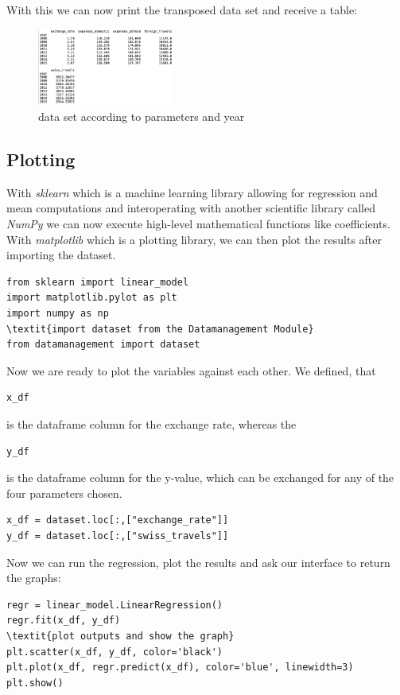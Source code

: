 \documentclass[12pt,a4paper,bibliography=totocnumbered,listof=totocnumbered]{scrartcl}
\begin{document}
With this we can now print the transposed data set and receive a table:

\begin{figure}[htbp] 
  \centering
     \includegraphics[width=0.4\textwidth]{data_table}
  \caption{data set according to parameters and year }
  \label{fig: figure2}
\end{figure}


\subsection{Plotting}
With \textit{sklearn} which is a machine learning library allowing for regression and mean computations and interoperating with another scientific library called \textit{NumPy} we can now execute high-level mathematical functions like coefficients. With \textit{matplotlib} which is a plotting library, we can then plot the results after importing the dataset. 

\begin{verbatim}
from sklearn import linear_model
import matplotlib.pylot as plt
import numpy as np
\textit{import dataset from the Datamanagement Module}
from datamanagement import dataset
\end{verbatim}

Now we are ready to plot the variables against each other. We defined, that \begin{verbatim}
x_df
\end{verbatim} is the dataframe column for the exchange rate, whereas the \begin{verbatim}
y_df
\end{verbatim} is the dataframe column for the y-value, which can be exchanged for any of the four parameters chosen. 
\begin{verbatim}
x_df = dataset.loc[:,["exchange_rate"]]
y_df = dataset.loc[:,["swiss_travels"]]
\end{verbatim}


Now we can run the regression, plot the results and ask our interface to return the graphs:
\begin{verbatim}
regr = linear_model.LinearRegression()
regr.fit(x_df, y_df)
\textit{plot outputs and show the graph}
plt.scatter(x_df, y_df, color='black')
plt.plot(x_df, regr.predict(x_df), color='blue', linewidth=3)
plt.show()
\end{verbatim}
\end{document}
